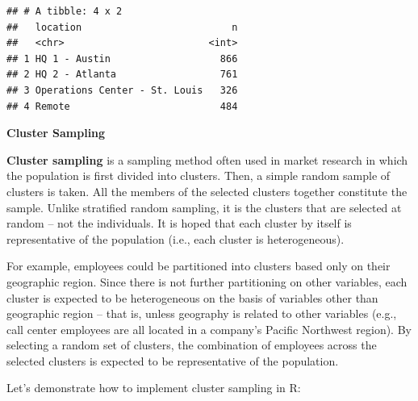 \documentclass[]{book}
\newenvironment{Shaded}{\begin{snugshade}}{\end{snugshade}}
\newcommand{\CommentTok}[1]{\textcolor[rgb]{0.56,0.35,0.01}{\textit{#1}}}
\newcommand{\DataTypeTok}[1]{\textcolor[rgb]{0.13,0.29,0.53}{#1}}
\newcommand{\FloatTok}[1]{\textcolor[rgb]{0.00,0.00,0.81}{#1}}
\newcommand{\KeywordTok}[1]{\textcolor[rgb]{0.13,0.29,0.53}{\textbf{#1}}}
\newcommand{\NormalTok}[1]{#1}
\newcommand{\OperatorTok}[1]{\textcolor[rgb]{0.81,0.36,0.00}{\textbf{#1}}}
\newcommand{\StringTok}[1]{\textcolor[rgb]{0.31,0.60,0.02}{#1}}
\begin{document}
\begin{Shaded}
\end{Shaded}

\begin{verbatim}
## # A tibble: 4 x 2
##   location                          n
##   <chr>                         <int>
## 1 HQ 1 - Austin                   866
## 2 HQ 2 - Atlanta                  761
## 3 Operations Center - St. Louis   326
## 4 Remote                          484
\end{verbatim}

\textbf{Cluster Sampling}

\textbf{Cluster sampling} is a sampling method often used in market research in which the population is first divided into clusters. Then, a simple random sample of clusters is taken. All the members of the selected clusters together constitute the sample. Unlike stratified random sampling, it is the clusters that are selected at random -- not the individuals. It is hoped that each cluster by itself is representative of the population (i.e., each cluster is heterogeneous).

For example, employees could be partitioned into clusters based only on their geographic region. Since there is not further partitioning on other variables, each cluster is expected to be heterogeneous on the basis of variables other than geographic region -- that is, unless geography is related to other variables (e.g., call center employees are all located in a company's Pacific Northwest region). By selecting a random set of clusters, the combination of employees across the selected clusters is expected to be representative of the population.

Let's demonstrate how to implement cluster sampling in R:
\end{document}
